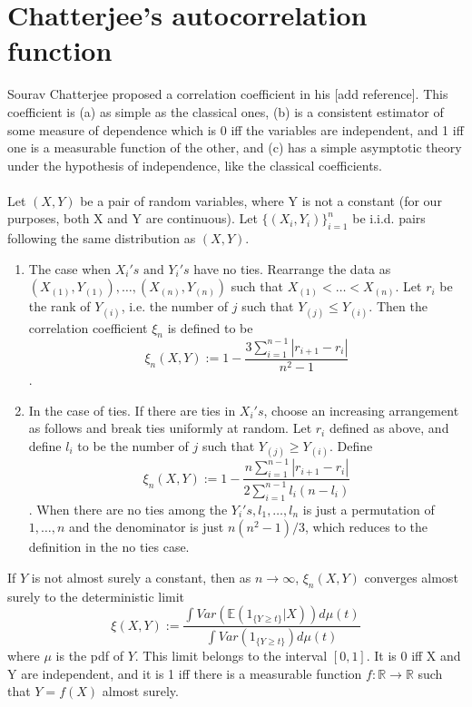 \chapter{Chatterjee's autocorrelation function}

Sourav Chatterjee proposed a correlation coefficient in his [add reference].
This coefficient is (a) as simple as the classical ones, (b) is a consistent estimator of some measure of dependence which is 0 iff the variables are independent, and 1 iff one is a measurable function of the other, and (c) has a simple asymptotic theory under the hypothesis of independence, like the classical coefficients. \\\\
Let $(X, Y)$ be a pair of random variables, where Y is not a constant (for our purposes, both X and Y are continuous). Let $\{(X_i, Y_i)\}_{i = 1}^{n}$ be i.i.d. pairs following the same distribution as $(X, Y)$.
\begin{enumerate}
    \item The case when $X_i's \text{ and } Y_i's$ have no ties. Rearrange the data as\\ $(X_{(1)}, Y_{(1)}), \dots, (X_{(n)}, Y_{(n)})$ such that $X_{(1)} < \dots < X_{(n)}$. Let $r_i$ be the rank of $Y_{(i)}$, i.e. the number of $j$ such that $Y_{(j)} \leq Y_{(i)}$.  Then the correlation coefficient $\xi_n$ is defined to be
    $$\xi_n(X, Y) := 1-\frac{3\sum_{i=1}^{n-1} |r_{i+1} - r_i|}{n^2-1}$$.

    \item In the case of ties. If there are ties in $X_i's$, choose an increasing arrangement as follows and break ties uniformly at random. Let $r_i$ defined as above, and define $l_i$ to be the number of $j$ such that $Y_{(j)} \geq Y_{(i)}$. Define
    $$\xi_n(X, Y) := 1-\frac{n\sum_{i=1}^{n-1} |r_{i+1} - r_i|}{2\sum_{i=1}^{n-1}l_i(n-l_i)}$$.
    When there are no ties among the $Y_i's, l_1, \dots, l_n$ is just a permutation of $1, \dots, n$ and the denominator is just $n(n^2-1)/3$, which reduces to the definition in the no ties case.
\end{enumerate}

\begin{theorem}
If $Y$ is not almost surely a constant, then as $n \rightarrow \infty$, $\xi_n(X, Y)$ converges almost surely to the deterministic limit
$$\xi(X, Y) := \frac{\int Var(\mathbb{E}(1_{\{Y \geq t\}}|X)) d\mu(t)}{\int Var(1_{\{Y \geq t\}}) d\mu(t)}$$
where $\mu$ is the pdf of $Y$. This limit belongs to the interval $[0, 1]$. It is 0 iff X and Y are independent, and it is 1 iff there is a measurable function $f:\mathbb{R} \rightarrow \mathbb{R}$ such that $Y = f(X)$ almost surely.
\end{theorem}
